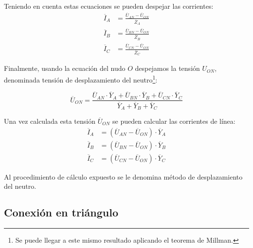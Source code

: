 Teniendo en cuenta estas ecuaciones se pueden despejar las corrientes:
\begin{align*}
  \overline{I}_A &= \frac{\overline{U}_{AN} - \overline{U}_{ON}}{\overline{Z}_A}\\
  \overline{I}_B &= \frac{\overline{U}_{BN} - \overline{U}_{ON}}{\overline{Z}_B}\\
  \overline{I}_C &= \frac{\overline{U}_{CN} - \overline{U}_{ON}}{\overline{Z}_C}
\end{align*}

Finalmente, usando la ecuación del nudo \(O\) despejamos la tensión \(U_{ON}\), denominada tensión de desplazamiento del neutro\footnote{Se puede llegar a este mismo resultado aplicando el teorema de Millman.}:

\begin{equation}
  \label{eq:desplazamiento-neutro}
  \overline{U}_{ON} = \frac{\overline{U}_{AN} \cdot \overline{Y}_A + \overline{U}_{BN} \cdot \overline{Y}_B + \overline{U}_{CN} \cdot \overline{Y}_C}{\overline{Y}_A + \overline{Y}_B + \overline{Y}_C}
\end{equation}

Una vez calculada esta tensión \(\overline{U}_{ON}\) se pueden calcular las corrientes de línea:
\begin{align*}
  \overline{I}_A &= (\overline{U}_{AN} - \overline{U}_{ON})\cdot{\overline{Y}_A}\\
  \overline{I}_B &= (\overline{U}_{BN} - \overline{U}_{ON})\cdot{\overline{Y}_B}\\
  \overline{I}_C &= (\overline{U}_{CN} - \overline{U}_{ON})\cdot{\overline{Y}_C}
\end{align*}

Al procedimiento de cálculo expuesto se le denomina método de desplazamiento del neutro.

\subsection{Conexión en triángulo}\label{sec:triangulo}
	

